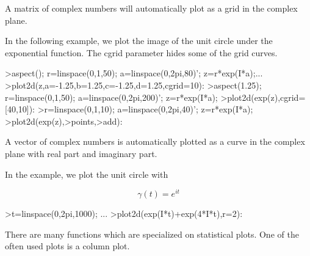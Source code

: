\documentclass{article}
\begin{document}
\begin{eulernotebook}
\begin{eulercomment}
\begin{eulercomment}
\begin{eulercomment}
\begin{eulercomment}
\begin{eulercomment}
\begin{eulercomment}
\begin{eulercomment}
A matrix of complex numbers will automatically plot as a grid in the complex plane.

In the following example, we plot the image of the unit circle under the exponential
function. The cgrid parameter hides some of the grid curves.
\end{eulercomment}
\begin{eulerprompt}
>aspect(); r=linspace(0,1,50); a=linspace(0,2pi,80)'; z=r*exp(I*a);...
>plot2d(z,a=-1.25,b=1.25,c=-1.25,d=1.25,cgrid=10):
>aspect(1.25); r=linspace(0,1,50); a=linspace(0,2pi,200)'; z=r*exp(I*a);
>plot2d(exp(z),cgrid=[40,10]):
>r=linspace(0,1,10); a=linspace(0,2pi,40)'; z=r*exp(I*a);
>plot2d(exp(z),>points,>add):
\end{eulerprompt}
\begin{eulercomment}
A vector of complex numbers is automatically plotted as a curve in the complex plane
with real part and imaginary part.

In the example, we plot the unit circle with

\end{eulercomment}
\begin{eulerformula}
\[
\gamma(t) = e^{it}
\]
\end{eulerformula}
\begin{eulerprompt}
>t=linspace(0,2pi,1000); ...
>plot2d(exp(I*t)+exp(4*I*t),r=2):
\end{eulerprompt}
\begin{eulercomment}
There are many functions which are specialized on statistical plots. One of the often
used plots is a column plot.


\end{eulercomment}
\end{eulercomment}
\end{eulercomment}
\end{eulercomment}
\end{eulercomment}
\end{eulercomment}
\end{eulercomment}
\end{eulernotebook}
\end{document}
